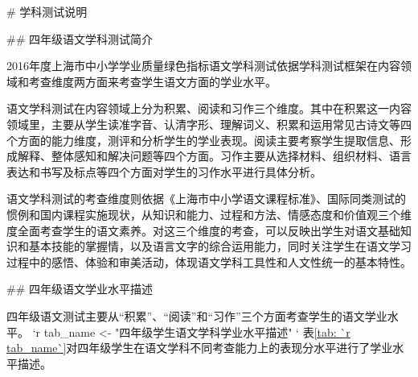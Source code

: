 # 学科测试说明

## 四年级语文学科测试简介

2016年度上海市中小学学业质量绿色指标语文学科测试依据学科测试框架在内容领域和考查维度两方面来考查学生语文方面的学业水平。

语文学科测试在内容领域上分为积累、阅读和习作三个维度。其中在积累这一内容领域里，主要从学生读准字音、认清字形、理解词义、积累和运用常见古诗文等四个方面的能力维度，测评和分析学生的学业表现。阅读主要考察学生提取信息、形成解释、整体感知和解决问题等四个方面。习作主要从选择材料、组织材料、语言表达和书写及标点等四个方面对学生的习作水平进行具体分析。


语文学科测试的考查维度则依据《上海市中小学语文课程标准》、国际同类测试的惯例和国内课程实施现状，从知识和能力、过程和方法、情感态度和价值观三个维度全面考查学生的语文素养。对这三个维度的考查，可以反映出学生对语文基础知识和基本技能的掌握情，以及语言文字的综合运用能力，同时关注学生在语文学习过程中的感悟、体验和审美活动，体现语文学科工具性和人文性统一的基本特性。

## 四年级语文学业水平描述

四年级语文测试主要从“积累”、“阅读”和“习作”三个方面考查学生的语文学业水平。
`r tab_name <- "四年级学生语文学科学业水平描述" `
表\ref{tab: `r tab_name`}对四年级学生在语文学科不同考查能力上的表现分水平进行了学业水平描述。

